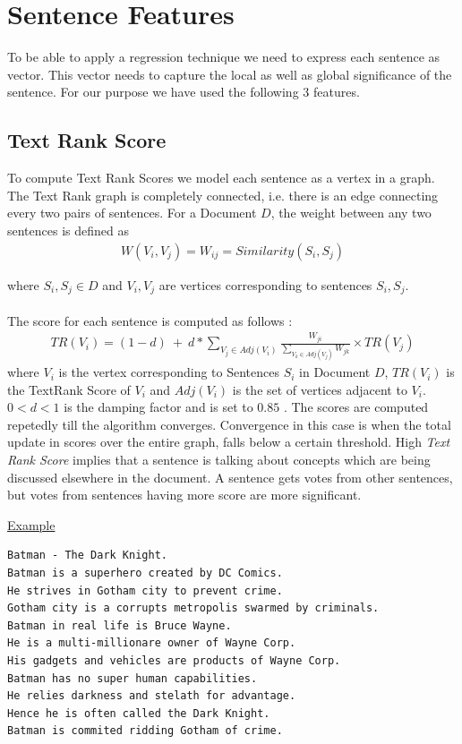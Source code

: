 \documentclass[BTech]{nitgoathesis}
\begin{document}
\section{Sentence Features}
To be able to apply a regression technique we need to express each sentence as vector. This vector needs to capture the local as well as global significance of the sentence. For our purpose we have used the following 3 features.

\subsection{Text Rank Score}
To compute Text Rank Scores \cite{textrank} we model each sentence as a vertex in a graph. The Text Rank graph is completely connected, i.e. there is an edge connecting every two pairs of sentences. For a Document $D$, the weight between any two sentences is defined as 
\begin{align}
W( V_i,V_j) = W_{ij} = Similarity(S_i,S_j)
\end{align}

where $S_i,S_j \in D$  and $V_i,V_j$ are vertices corresponding to sentences $S_i,S_j$.\\
\\
The score for each sentence is computed as follows : 
\begin{align}
TR(V_i) = (1 - d)\ +\ d*\sum\limits_{V_j \in Adj(V_i)} \frac{W_{ji}}{\sum\limits_{V_k \in Adj(V_j)} W_{jk}} \times TR(V_j)
\end{align}
where $V_i$ is the vertex corresponding to Sentences $S_i$ in Document $D$, $TR(V_i)$ is the TextRank Score of $V_i$ and $Adj(V_i)$ is the set of vertices adjacent to $V_i$. $0 < d < 1$ is the damping factor and is set to $0.85$ \cite{brin}. The scores are computed repetedly till the algorithm converges. Convergence in this case is when the total update in scores over the entire graph, falls below a certain threshold. High \emph{Text Rank Score} implies that a sentence is talking about concepts which are being discussed elsewhere in the document. A sentence gets votes from other sentences, but votes from sentences having more score are more significant.\\
\par
{\noindent \large \underline{Example}} 
\begin{lstlisting}
Batman - The Dark Knight.
Batman is a superhero created by DC Comics.
He strives in Gotham city to prevent crime.
Gotham city is a corrupts metropolis swarmed by criminals.
Batman in real life is Bruce Wayne.
He is a multi-millionare owner of Wayne Corp.
His gadgets and vehicles are products of Wayne Corp.
Batman has no super human capabilities.
He relies darkness and stelath for advantage.
Hence he is often called the Dark Knight.
Batman is commited ridding Gotham of crime.
\end{lstlisting}  
\end{document}
